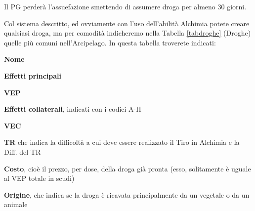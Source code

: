 Il PG perder\`a l'assuefazione smettendo di assumere droga per almeno
30 giorni.

Col sistema descritto, ed ovviamente con l'uso dell'abilit\`a Alchimia
potete creare qualsiasi droga, ma per comodit\`a indicheremo nella
Tabella \ref{tabdroghe} (Droghe) quelle pi\`u comuni nell'Arcipelago.
In questa tabella troverete indicati:

\begin{description}
\item{\textbf{Nome}}
\item{\textbf{Effetti principali}}
\item{\textbf{VEP}}
\item{\textbf{Effetti collaterali}}, indicati con i codici A-H
\item{\textbf{VEC}}
\item{\textbf{TR}} che indica la difficolt\`a a cui deve essere realizzato
  il Tiro in Alchimia e la Diff. del TR
\item{\textbf{Costo}}, cio\`e il prezzo, per dose, della droga gi\`a pronta
  (esso, solitamente \`e uguale al VEP totale in scudi)
\item{\textbf{Origine}}, che indica se la droga \`e ricavata
  principalmente da un vegetale o da un animale
\end{description}

\onecolumn




\twocolumn


